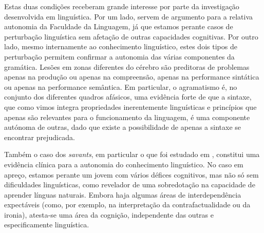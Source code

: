 \documentclass[output=paper,colorlinks,citecolor=brown,booklanguage=portuguese]{langscibook}
\begin{document}
Estas duas condições receberam grande interesse por parte da investigação desenvolvida em linguística. Por um lado, servem de argumento para a relativa autonomia da Faculdade da Linguagem, já que estamos perante casos de perturbação linguística sem afetação de outras capacidades cognitivas. Por outro lado, mesmo internamente ao conhecimento linguístico, estes dois tipos de perturbação permitem confirmar a autonomia das várias componentes da gramática. Lesões em zonas diferentes do cérebro são preditoras de problemas apenas na produção ou apenas na compreensão, apenas na performance sintática ou apenas na performance semântica. Em particular, o agramatismo é, no conjunto dos diferentes quadros afásicos, uma evidência forte de que a sintaxe, que como vimos integra propriedades inerentemente linguísticas e princípios que apenas são relevantes para o funcionamento da linguagem, é uma componente autónoma de outras, dado que existe a possibilidade de apenas a sintaxe se encontrar prejudicada.

Também o caso dos \emph{savants}, em particular o que foi estudado em \citet{Smith1995}, constitui uma evidência clínica para a autonomia do conhecimento linguístico. No caso em apreço, estamos perante um jovem com vários défices cognitivos, mas não só sem dificuldades linguísticas, como revelador de uma sobredotação na capacidade de aprender línguas naturais. Embora haja algumas áreas de interdependência expectáveis (como, por exemplo, na interpretação da contrafactualidade ou da ironia), atesta-se uma área da cognição, independente das outras e especificamente linguística.
\end{document}
